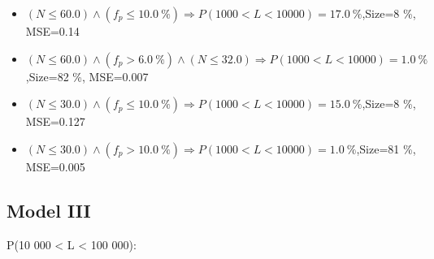 \documentclass[numbered]{CSL}
\begin{document}
\begin{itemize}
\item $(N \leq 60.0) \land (f_p \leq 10.0~\%) \Rightarrow P(1 000 < L < 10 000) = 17.0~\%$,\hfill Size=8 \%, MSE=0.14
\item $(N \leq 60.0) \land (f_p > 6.0~\%) \land (N \leq 32.0) \Rightarrow P(1 000 < L < 10 000) = 1.0~\%$,\hfill Size=82 \%, MSE=0.007
\item $(N \leq 30.0) \land (f_p \leq 10.0~\%) \Rightarrow P(1 000 < L < 10 000) = 15.0~\%$,\hfill Size=8 \%, MSE=0.127
\item $(N \leq 30.0) \land (f_p > 10.0~\%) \Rightarrow P(1 000 < L < 10 000) = 1.0~\%$,\hfill Size=81 \%, MSE=0.005
\end{itemize}

\subsection{Model III}
P(10 000 < L < 100 000):
\end{document}
